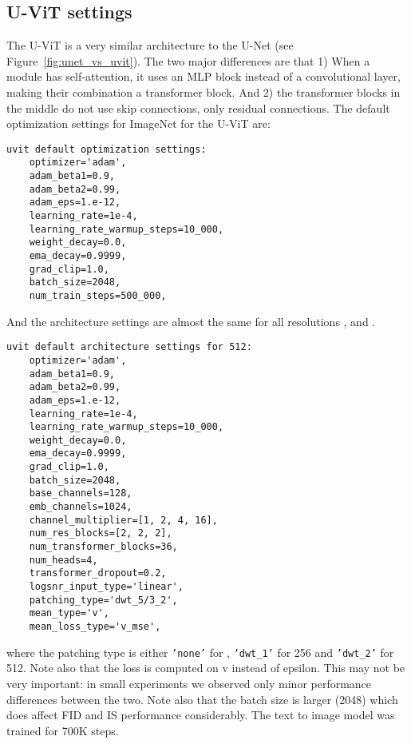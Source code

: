 \documentclass[nohyperref]{article}
\theoremstyle{plain}
\theoremstyle{definition}
\theoremstyle{remark}
\begin{document}
\subsection{U-ViT settings}
The U-ViT is a very similar architecture to the U-Net (see Figure~\ref{fig:unet_vs_uvit}). The two major differences are that 1) When a module has self-attention, it uses an MLP block instead of a convolutional layer, making their combination a transformer block. And 2) the transformer blocks in the middle do not use skip connections, only residual connections. The default optimization settings for ImageNet for the U-ViT are:
\begin{lstlisting}
uvit default optimization settings:
    optimizer='adam',
    adam_beta1=0.9,
    adam_beta2=0.99,
    adam_eps=1.e-12,
    learning_rate=1e-4,
    learning_rate_warmup_steps=10_000,
    weight_decay=0.0,
    ema_decay=0.9999,
    grad_clip=1.0,
    batch_size=2048,
    num_train_steps=500_000,
\end{lstlisting}

And the architecture settings are almost the same for all resolutions ,  and .
\begin{lstlisting}
uvit default architecture settings for 512:
    optimizer='adam',
    adam_beta1=0.9,
    adam_beta2=0.99,
    adam_eps=1.e-12,
    learning_rate=1e-4,
    learning_rate_warmup_steps=10_000,
    weight_decay=0.0,
    ema_decay=0.9999,
    grad_clip=1.0,
    batch_size=2048,
    base_channels=128,
    emb_channels=1024,
    channel_multiplier=[1, 2, 4, 16],
    num_res_blocks=[2, 2, 2],
    num_transformer_blocks=36,
    num_heads=4,
    transformer_dropout=0.2,
    logsnr_input_type='linear',
    patching_type='dwt_5/3_2',
    mean_type='v',
    mean_loss_type='v_mse',
\end{lstlisting}
where the patching type is either \texttt{'none'} for , \texttt{'dwt\_1'} for 256 and  \texttt{'dwt\_2'} for 512. Note also that the loss is computed on v instead of epsilon. This may not be very important: in small experiments we observed only minor performance differences between the two. Note also that the batch size is larger (2048) which does affect FID and IS performance considerably. The text to image model was trained for 700K steps.
\end{document}
